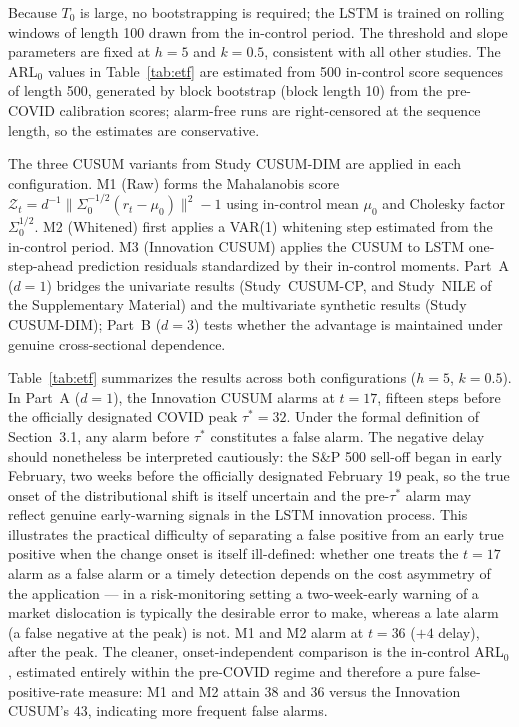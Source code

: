 \documentclass[bj,authoryear]{imsart}
\theoremstyle{plain}
\theoremstyle{definition}
\begin{document}
Because $T_0$ is large, no bootstrapping is required; the LSTM is trained on
rolling windows of length 100 drawn from the in-control period.
The threshold and slope parameters are fixed at $h=5$ and $k=0.5$, consistent with all other studies.
The ARL$_0$ values in Table~\ref{tab:etf} are estimated from 500
in-control score sequences of length 500, generated by block bootstrap
(block length 10) from the pre-COVID calibration scores; alarm-free runs
are right-censored at the sequence length, so the estimates are
conservative.

The three CUSUM variants from Study CUSUM-DIM are applied in each configuration.
M1 (Raw) forms the Mahalanobis score
$\mathcal{Z}_t = d^{-1}\|\Sigma_0^{-1/2}(r_t - \mu_0)\|^2 - 1$
using in-control mean $\mu_0$ and Cholesky factor $\Sigma_0^{1/2}$.
M2 (Whitened) first applies a VAR(1) whitening step estimated from the
in-control period.  M3 (Innovation CUSUM) applies the CUSUM to LSTM one-step-ahead
prediction residuals standardized by their in-control moments.
Part~A ($d=1$) bridges the univariate results (Study~CUSUM-CP, and
Study~NILE of the Supplementary Material) and the multivariate synthetic
results (Study CUSUM-DIM); Part~B ($d=3$) tests whether the
advantage is maintained under genuine cross-sectional dependence.

Table~\ref{tab:etf} summarizes the results across both configurations
($h=5$, $k=0.5$).  In Part~A ($d=1$), the Innovation CUSUM alarms at $t=17$, fifteen steps
before the officially designated COVID peak $\tau^*=32$.
Under the formal definition of Section~3.1, any alarm before $\tau^*$ constitutes a false alarm.
The negative delay should nonetheless be interpreted cautiously: the S\&P 500 sell-off began in early February, two weeks before the officially designated February 19 peak, so the true onset of the distributional shift is itself uncertain and the pre-$\tau^*$ alarm may reflect genuine early-warning signals in the LSTM innovation process.  This illustrates the practical
difficulty of separating a false positive from an early true positive when
the change onset is itself ill-defined: whether one treats the $t=17$ alarm
as a false alarm or a timely detection depends on the cost asymmetry of the
application --- in a risk-monitoring setting a two-week-early warning of a
market dislocation is typically the desirable error to make, whereas a late
alarm (a false negative at the peak) is not.  M1 and M2 alarm at $t=36$
($+4$ delay), after the peak.
The cleaner, onset-independent comparison is the in-control ARL$_0$,
estimated entirely within the pre-COVID regime and therefore a pure
false-positive-rate measure: M1 and M2 attain $38$ and $36$ versus the
Innovation CUSUM's $43$, indicating more frequent false alarms.
\end{document}
